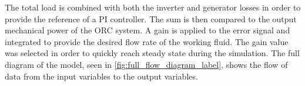 The total load is combined with both the inverter and generator losses in order to provide the reference of a PI controller. The sum is then compared to the output mechanical power of the ORC system. A gain is applied to the error signal and integrated to provide the desired flow rate of the working fluid. The gain value was selected in order to quickly reach steady state during the simulation. The full diagram of the model, seen in \autoref{fig:full_flow_diagram_label}, shows the flow of data from the input variables to the output variables.
%


\cleardoublepage